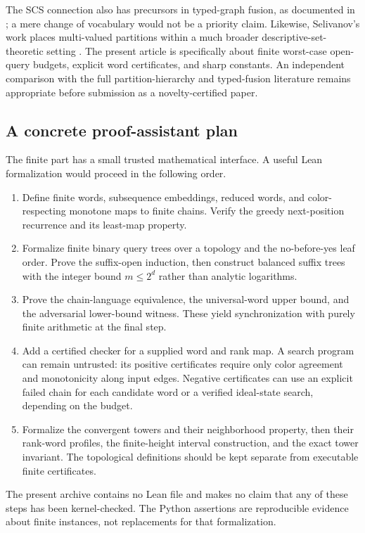 \documentclass[11pt,letterpaper]{article}
\numberwithin{equation}{section}
\theoremstyle{definition}
\theoremstyle{remark}
\theoremstyle{definition}
\begin{document}
The SCS connection also has precursors in typed-graph fusion, as documented in
\cite{LT}; a mere change of vocabulary would not be a priority claim. Likewise,
Selivanov's work places multi-valued partitions within a much broader
descriptive-set-theoretic setting \cite{Selivanov}. The present article is
specifically about finite worst-case open-query budgets, explicit word
certificates, and sharp constants. An independent comparison with the full
partition-hierarchy and typed-fusion literature remains appropriate before
submission as a novelty-certified paper.

\subsection{A concrete proof-assistant plan}
The finite part has a small trusted mathematical interface. A useful Lean
formalization would proceed in the following order.
\begin{enumerate}
\item Define finite words, subsequence embeddings, reduced words, and
color-respecting monotone maps to finite chains. Verify the greedy next-position
recurrence and its least-map property.
\item Formalize finite binary query trees over a topology and the no-before-yes
leaf order. Prove the suffix-open induction, then construct balanced suffix
trees with the integer bound $m\le2^d$ rather than analytic logarithms.
\item Prove the chain-language equivalence, the universal-word upper bound,
and the adversarial lower-bound witness. These yield synchronization with
purely finite arithmetic at the final step.
\item Add a certified checker for a supplied word and rank map. A search
program can remain untrusted: its positive certificates require only color
agreement and monotonicity along input edges. Negative certificates can use
an explicit failed chain for each candidate word or a verified ideal-state
search, depending on the budget.
\item Formalize the convergent towers and their neighborhood property, then
their rank-word profiles, the finite-height interval construction, and the
exact tower invariant. The topological definitions should be kept separate
from executable finite certificates.
\end{enumerate}
The present archive contains no Lean file and makes no claim that any of these
steps has been kernel-checked. The Python assertions are reproducible evidence
about finite instances, not replacements for that formalization.
\end{document}
